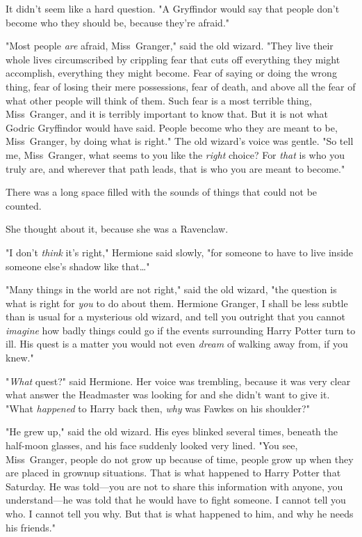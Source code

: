 It didn't seem like a hard question. "A Gryffindor would say that people don't
become who they should be, because they're afraid."

"Most people \emph{are} afraid, Miss~Granger," said the old wizard. "They live
their whole lives circumscribed by crippling fear that cuts off everything they
might accomplish, everything they might become. Fear of saying or doing the
wrong thing, fear of losing their mere possessions, fear of death, and above
all the fear of what other people will think of them. Such fear is a most
terrible thing, Miss~Granger, and it is terribly important to know that. But it
is not what Godric Gryffindor would have said. People become who they are meant
to be, Miss~Granger, by doing what is right." The old wizard's voice was
gentle. "So tell me, Miss~Granger, what seems to you like the \emph{right}
choice? For \emph{that} is who you truly are, and wherever that path leads,
that is who you are meant to become."

There was a long space filled with the sounds of things that could not be
counted.

She thought about it, because she was a Ravenclaw.

"I don't \emph{think} it's right," Hermione said slowly, "for someone to have
to live inside someone else's shadow like that{\ldots}"

"Many things in the world are not right," said the old wizard, "the question is
what is right for \emph{you} to do about them. Hermione Granger, I shall be
less subtle than is usual for a mysterious old wizard, and tell you outright
that you cannot \emph{imagine} how badly things could go if the events
surrounding Harry Potter turn to ill. His quest is a matter you would not even
\emph{dream} of walking away from, if you knew."

"\emph{What} quest?" said Hermione. Her voice was trembling, because it was
very clear what answer the Headmaster was looking for and she didn't want to
give it. "What \emph{happened} to Harry back then, \emph{why} was Fawkes on his
shoulder?"

"He grew up," said the old wizard. His eyes blinked several times, beneath the
half-moon glasses, and his face suddenly looked very lined. "You see,
Miss~Granger, people do not grow up because of time, people grow up when they are
placed in grownup situations. That is what happened to Harry Potter that
Saturday. He was told---you are not to share this information with anyone, you
understand---he was told that he would have to fight someone. I cannot tell you
who. I cannot tell you why. But that is what happened to him, and why he needs
his friends."

